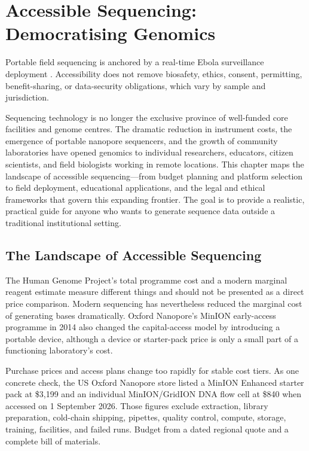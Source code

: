 \chapter{Accessible Sequencing: Democratising Genomics}
\label{ch:accessible}

\begin{sourcebox}
Portable field sequencing is anchored by a real-time Ebola surveillance deployment \cite{quick2016}. Accessibility does not remove biosafety, ethics, consent, permitting, benefit-sharing, or data-security obligations, which vary by sample and jurisdiction.
\end{sourcebox}

\begin{keyconcept}
Sequencing technology is no longer the exclusive province of well-funded core facilities and genome centres. The dramatic reduction in instrument costs, the emergence of portable nanopore sequencers, and the growth of community laboratories have opened genomics to individual researchers, educators, citizen scientists, and field biologists working in remote locations. This chapter maps the landscape of accessible sequencing---from budget planning and platform selection to field deployment, educational applications, and the legal and ethical frameworks that govern this expanding frontier. The goal is to provide a realistic, practical guide for anyone who wants to generate sequence data outside a traditional institutional setting.
\end{keyconcept}

\section{The Landscape of Accessible Sequencing}
\label{sec:accessible:landscape}

The Human Genome Project's total programme cost and a modern marginal reagent estimate measure different things and should not be presented as a direct price comparison. Modern sequencing has nevertheless reduced the marginal cost of generating bases dramatically. Oxford Nanopore's MinION early-access programme in 2014 also changed the capital-access model by introducing a portable device, although a device or starter-pack price is only a small part of a functioning laboratory's cost.

Purchase prices and access plans change too rapidly for stable cost tiers. As one concrete check, the US Oxford Nanopore store listed a MinION Enhanced starter pack at \$3{,}199 and an individual MinION/GridION DNA flow cell at \$840 when accessed on 1 September 2026. Those figures exclude extraction, library preparation, cold-chain shipping, pipettes, quality control, compute, storage, training, facilities, and failed runs. Budget from a dated regional quote and a complete bill of materials.

